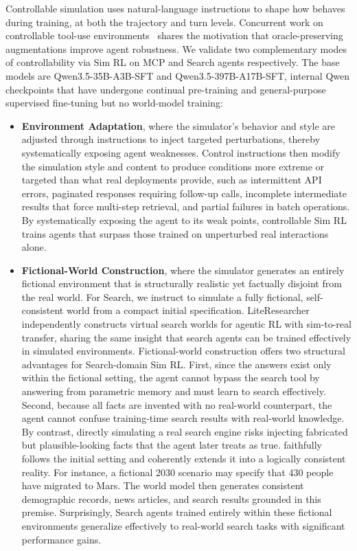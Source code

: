 Controllable simulation uses natural-language instructions to shape how \method behaves during training, at both the trajectory and turn levels.
Concurrent work on controllable tool-use environments~\citep{xu2026controllable} shares the motivation that oracle-preserving augmentations improve agent robustness.
We validate two complementary modes of controllability via Sim RL on MCP and Search agents respectively.
The base models are Qwen3.5-35B-A3B-SFT and Qwen3.5-397B-A17B-SFT, internal Qwen checkpoints that have undergone continual pre-training and general-purpose supervised fine-tuning but no world-model training:
\begin{itemize}[leftmargin=1.5em,itemsep=2pt]
    \item \textbf{Environment Adaptation}, where the simulator’s behavior and style are adjusted through instructions to inject targeted perturbations, thereby systematically exposing agent weaknesses.
    Control instructions then modify the simulation style and content to produce conditions more extreme or targeted than what real deployments provide, such as intermittent API errors, paginated responses requiring follow-up calls, incomplete intermediate results that force multi-step retrieval, and partial failures in batch operations.
    By systematically exposing the agent to its weak points, controllable Sim RL trains agents that surpass those trained on unperturbed real interactions alone.

    \item \textbf{Fictional-World Construction}, where the simulator generates an entirely fictional environment that is structurally realistic yet factually disjoint from the real world.
    For Search, we instruct \method to simulate a fully fictional, self-consistent world from a compact initial specification.
    LiteResearcher~\citep{li2026literesearcher} independently constructs virtual search worlds for agentic RL with sim-to-real transfer, sharing the same insight that search agents can be trained effectively in simulated environments.
    Fictional-world construction offers two structural advantages for Search-domain Sim RL.
    First, since the answers exist only within the fictional setting, the agent cannot bypass the search tool by answering from parametric memory and must learn to search effectively.
    Second, because all facts are invented with no real-world counterpart, the agent cannot confuse training-time search results with real-world knowledge. By contrast, directly simulating a real search engine risks injecting fabricated but plausible-looking facts that the agent later treats as true.
    \method faithfully follows the initial setting and coherently extends it into a logically consistent reality.
    For instance, a fictional 2030 scenario may specify that 430 people have migrated to Mars.
    The world model then generates consistent demographic records, news articles, and search results grounded in this premise.
    Surprisingly, Search agents trained entirely within these fictional environments generalize effectively to real-world search tasks with significant performance gains.
\end{itemize}

